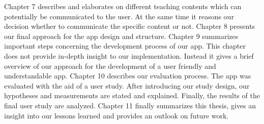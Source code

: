 \newline
\newline
Chapter 7 describes and elaborates on different teaching contents which can potentially be communicated to the user. At the same time it reasons our decision whether to communicate the specific content or not.
\newline
\newline
Chapter 8 presents our final approach for the app design and structure.
\newline
\newline
Chapter 9 summarizes important steps concerning the development process of our app.
This chapter does not provide in-depth insight to our implementation.
Instead it gives a brief overview of our approach for the development of a user friendly and understandable app.
\newline
\newline
Chapter 10 describes our evaluation process.
 The app was evaluated with the aid of a user study.
 After introducing our study design, our hypotheses and measurements are stated and explained.
Finally, the results of the final user study are analyzed.
\newline
\newline
Chapter 11 finally summarizes this thesis, gives an insight into our lessons learned and provides an outlook on future work.



